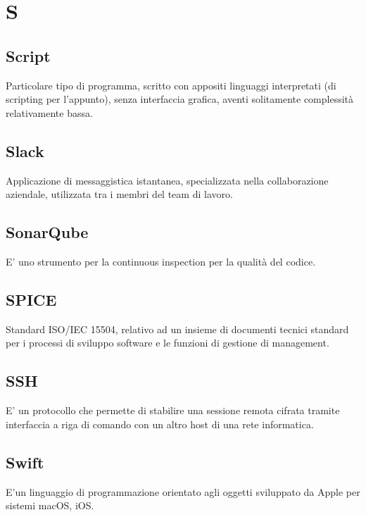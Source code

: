 \section*{S}

\subsection{Script}
Particolare tipo di programma, scritto con appositi linguaggi interpretati (di scripting per l'appunto), senza interfaccia grafica, aventi solitamente complessità relativamente bassa.

\subsection{Slack}
Applicazione di messaggistica istantanea, specializzata nella collaborazione aziendale, utilizzata tra i membri del team di lavoro.

\subsection{SonarQube} 
E' uno strumento per la continuous inspection per la qualità del codice.

\subsection{SPICE}
Standard ISO/IEC 15504, relativo ad un insieme di documenti tecnici standard per i processi di sviluppo software e le funzioni di gestione di management.

\subsection{SSH}
E' un protocollo che permette di stabilire una sessione remota cifrata tramite interfaccia a riga di comando con un altro host di una rete informatica.

\subsection{Swift}
E'un linguaggio di programmazione orientato agli oggetti sviluppato da Apple per sistemi macOS, iOS.
